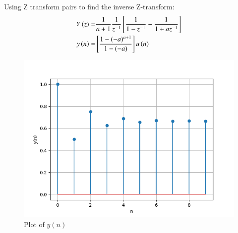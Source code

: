 \documentclass[journal,12pt,twocolumn]{IEEEtran}
\theoremstyle{remark}
\begin{document}
Using Z transform pairs  to find the inverse Z-transform:\\
\begin{align}
    Y\left(z\right)=& \frac{1}{a+1} \frac{1}{z^{-1}}{}\left[\frac{1}{1-z^{-1}} - \frac{1}{1+az^{-1}}\right]\\
    y\left(n\right) =&  {}\left[\frac{1-(-a)^{n+1}}{1-(-a)}\right]u\left(n\right)
\end{align}
\begin{figure}[ht!]
	\includegraphics[width=\columnwidth]{plots/Figure_1.png}
	\caption{Plot of $y(n)$}
	\label{fig:1.2}
\end{figure}
\end{document}
